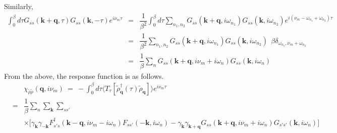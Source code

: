 \documentclass[a4j]{jsarticle}
\begin{document}
%
%
%
%
Similarly,
%
%
%
%
\begin{eqnarray}
	\int^{\beta}_{0} d \tau
	G_{ s s } ( \bm{k} + \bm{q} , \tau )
	G_{ s s } ( \bm{k} , - \tau )
	e^{i \nu_{m} \tau}
	&=&
	\dfrac{1}{\beta^{2}}
	\int^{\beta}_{0} d \tau
	\sum_{n_{1},n_{2}}
	G_{ s s } ( \bm{k} + \bm{q} , i \omega_{n_{1}} )
	G_{ s s } ( \bm{k} , i \omega_{n_{2}} )
	e^{i ( \nu_{m} - \omega_{n_{1}} + \omega_{n_{2}} ) \tau }
	\nonumber \\[2mm] &=&
	\dfrac{ 1 }{\beta^{2}} \sum_{n_{1},n_{2}}
	G_{ s s } ( \bm{k} + \bm{q} , i \omega_{n_{1}} )
	G_{ s s } ( \bm{k} , i \omega_{n_{2}} )
	\ \ \beta
	\delta_{ \omega_{n_{1}} , \nu_{m} + \omega_{n_{2}} }
	\nonumber \\[2mm] &=&
	\dfrac{ 1 }{\beta} \sum_{n}
	G_{ s s } ( \bm{k} + \bm{q} , i \nu_{m} + i \omega_{n} )
	G_{ s s } ( \bm{k} , i \omega_{n} )
\end{eqnarray}
%
%
%
%
From the above, the response function is as follows.
%
%
%
%
\begin{eqnarray}
	&&
	\chi_{\tilde{\rho} \tilde{\rho}}(\bm{q},i \nu_{m})
	\ = \
	-
	\int^{\beta}_{0} d \tau
	\langle T_{\tau}[ \tilde{\rho}_{\bm{q}}^{\dagger} (\tau) \tilde{\rho}_{\bm{q}} ] \rangle
	e^{i \nu_{m} \tau}
	\nonumber \ \\[2mm]
	&=&
	\dfrac{1}{\beta}
	\sum_{n}
	\sum_{ \bm{k} }
	\sum_{s s'}
    \\ && \times
	\Big[
		\gamma_{\bm{k}}
		\gamma_{-\bm{k}}
		F_{ s' s }^{\dagger}( \bm{k} - \bm{q} , i \nu_{m} - i \omega_{n} )
		F_{ s s' } ( - \bm{k} , i \omega_{n} )
		-
		\gamma_{\bm{k}}
		\gamma_{\bm{k}+\bm{q}}
		G_{ s s } ( \bm{k} + \bm{q} , i \nu_{m} + i \omega_{n} )
		G_{ s' s' } ( \bm{k} , i \omega_{n} )
		\Big]
\end{eqnarray}
%
%
%
%
\end{document}
